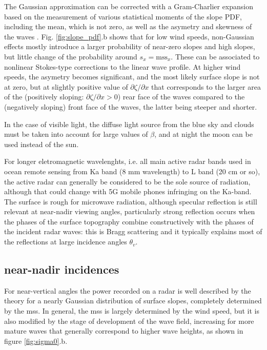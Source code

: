 The Gaussian approximation can be corrected with a Gram-Charlier expansion based on the measurement of various statistical  moments of the slope PDF, including the mean, which is not zero, as well as the asymetry and skewness of the waves \citep{Cox&Munk1954,Munk2009}. Fig. \ref{fig:slope_pdf}.b shows that for low wind speeds, non-Gaussian effects mostly introduce a larger probability of near-zero slopes and high slopes, but little change of the probability around $s_x=\mathrm{mss}_x$. These can be associated to nonlinear Stokes-type corrections to the linear wave profile. At higher wind speeds, the asymetry becomes significant, and the most likely surface slope is not at zero, but at slightly positive value of $\partial \zeta/ \partial x$ that corresponds to the larger area of the (positively sloping: $\partial \zeta/ \partial x > 0$) rear face of the waves compared to the (negatively sloping) front face of the waves, the latter being steeper and shorter. 

In the case of visible light,  the diffuse light source from the blue sky and clouds must be taken into account for large values of $\beta$, and at night the moon can be used instead of the sun. 

For longer eletromagnetic wavelenghts, i.e. all main active radar bands used in ocean remote sensing from Ka band (8 mm wavelength) to L band (20 cm or so), the active radar can generally be considered to be the sole source of radiation, although that could change with 5G mobile phones infringing on the Ka-band. %
 The surface is rough for microwave radiation, although specular reflection is still relevant at near-nadir viewing angles, particularly strong reflection occurs when the phases of the surface topography combine constructively with the phases of the incident radar waves: this is Bragg scattering and it typically explains most of the reflections at large incidence angles $\theta_v$.

\subsection{near-nadir incidences}
For near-vertical angles the power recorded on a radar is well described by the theory for a nearly Gaussian distribution of surface slopes, 
completely determined by the mss. In general, the mss is largely determined by the wind speed, but it is also modified by the stage of  development of the wave field, increasing for more mature waves that generally correspond to higher wave heights, as shown in figure 
\ref{fig:sigma0}.b. 


